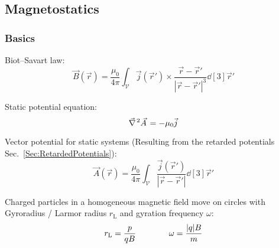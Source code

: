 	\subsection{Magnetostatics}
		\subsubsection{Basics}
			\noindent
			Biot--Savart law:
			\begin{equation}
				\vec{B}(\vec{r}) = \frac{\mu_0}{4\pi}\int_{\mathcal{V}} \vec{j}(\vec{r}')\times\frac{\vec{r}-\vec{r}'}{\left|\vec{r}-\vec{r}'\right|^3}\dd[3]{\vec{r}'}
			\end{equation}

			\noindent
			Static potential equation:
			\begin{equation}
				\Nabla^2 \vec{A} = - \mu_0 \vec{j}
			\end{equation}

			\noindent
			Vector potential for static systems (Resulting from the retarded potentials Sec.~\ref{Sec:RetardedPotentials}):
			\begin{equation}
				\vec{A}(\vec{r}) = \frac{\mu_0}{4\pi} \int_{\mathcal{V}} \frac{\vec{j}(\vec{r}')}{\left|\vec{r}-\vec{r}'\right|} \dd[3]{\vec{r}'}
			\end{equation}

			\noindent
			Charged particles in a homogeneous magnetic field move on circles with Gyroradius / Larmor radius $r_\text{L}$ and gyration frequency $\omega$:
			\begin{equation}
				\begin{aligned}
					r_\text{L} = \frac{p}{qB} &&\hspace{30pt}
					\omega = \frac{|q| B}{m}
				\end{aligned}
			\end{equation}

